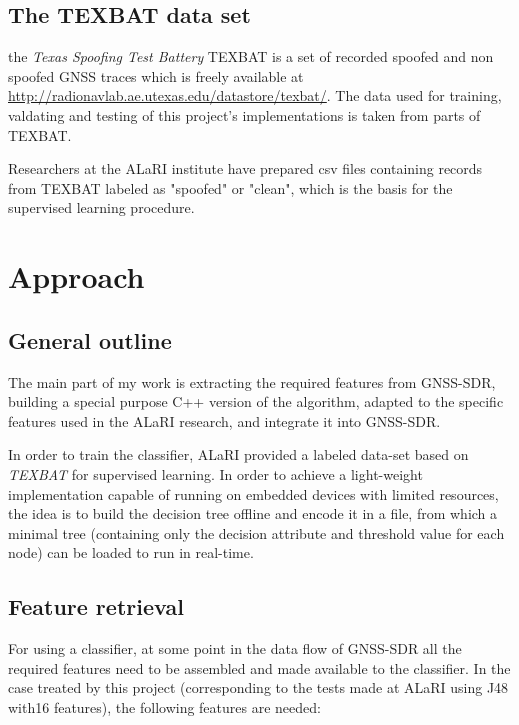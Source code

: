 \documentclass[a4paper]{usiinfbachelorproject}
\begin{document}
	\subsection{\textbf{The TEXBAT data set}}
	
the \emph{Texas Spoofing Test Battery} TEXBAT is a set of recorded spoofed and non spoofed GNSS traces which is freely
available at \href{http://radionavlab.ae.utexas.edu/datastore/texbat/}{http://radionavlab.ae.utexas.edu/datastore/texbat/}.
The data used for training, valdating and testing of this project's implementations is taken from parts of TEXBAT.

Researchers at the ALaRI institute have prepared csv files containing records from TEXBAT labeled as "spoofed" or
"clean", which is the basis for the supervised learning procedure.






\section{\textbf{Approach}}

	\subsection{\textbf{General outline}}

The main part of my work is extracting the required features from GNSS-SDR, building a special purpose C++ version of the algorithm, adapted to the specific features used in the ALaRI research, and integrate it into GNSS-SDR.

In order to train the classifier, ALaRI provided a labeled data-set based on \emph{TEXBAT} for supervised learning. In order to achieve 
a light-weight implementation capable of running on embedded devices with limited resources, the idea is to build the
decision tree offline and encode it in a file, from which a minimal tree (containing only the decision attribute and threshold value for each node) can be loaded to run in real-time.
		
	\subsection{\textbf{Feature retrieval}}
	
For using a classifier, at some point in the data flow of GNSS-SDR all the required features need to be assembled
and made available to the classifier. In the case treated by this project (corresponding to the tests made at ALaRI
using J48 with16 features), the following features are needed:
\end{document}
